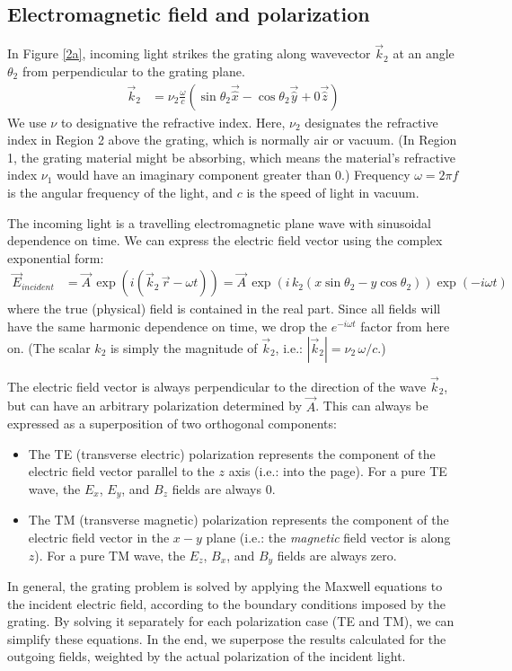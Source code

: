 \subsection{Electromagnetic field and polarization}
In Figure \ref{2a}, incoming light strikes the grating along wavevector $\vec k_2$ at an angle $\theta_2$ from perpendicular to the grating plane.
\begin{align}
\vec k_2 &= \nu_2 \frac{\omega}{c} \left( \sin \theta_2 \vec{\hat x} - \cos \theta_2 \vec{\hat y} + 0 \vec{\hat z} \right)
\end{align}
We use $\nu$ to designative the refractive index. Here, $\nu_2$ designates the refractive index in Region 2 above the grating, which is normally air or vacuum.  (In Region 1, the grating material might be absorbing, which means the material's refractive index $\nu_1$ would have an imaginary component greater than 0.)  Frequency $\omega = 2\pi f$ is the angular frequency of the light, and $c$ is the speed of light in vacuum.

The incoming light is a travelling electromagnetic plane wave with sinusoidal dependence on time.  We can express the electric field vector using the complex exponential form:
\begin{align}
\label{eqnPlaneWave}
\vec E_{incident} &= \vec A\, \exp \left(i (\vec k_2 \,  \vec r - \omega t)\right)  = \vec A\, \exp \left(i\, k_2 (x \sin \theta_2 - y \cos \theta_2)\right)\exp \left(- i \omega t\right)
\end{align}
where the true (physical) field is contained in the real part.  Since all fields will have the same harmonic dependence on time, we drop the $e^{-i\omega t}$ factor from here on.  (The scalar $k_2$ is simply the magnitude of $\vec k_2$, i.e.: $\left| \vec k_2 \right| = \nu_2\, \omega/c$.)

The electric field vector is always perpendicular to the direction of the wave $\vec k_2$, but can have an arbitrary polarization determined by $\vec A$.  This can always be expressed as a superposition of two orthogonal components:
\begin{itemize}
\item The TE (transverse electric) polarization represents the component of the electric field vector parallel to the $z$ axis (i.e.: into the page).  For a pure TE wave, the $E_x$, $E_y$, and $B_z$ fields are always 0.
\item The TM (transverse magnetic) polarization represents the component of the electric field vector in the $x-y$ plane (i.e.: the \emph{magnetic} field vector is along $z$).  For a pure TM wave, the $E_z$, $B_x$, and $B_y$ fields are always zero.
\end{itemize}
In general, the grating problem is solved by applying the Maxwell equations to the incident electric field, according to the boundary conditions imposed by the grating.  By solving it separately for each polarization case (TE and TM), we can simplify these equations.  In the end, we superpose the results calculated for the outgoing fields, weighted by the actual polarization of the incident light.

